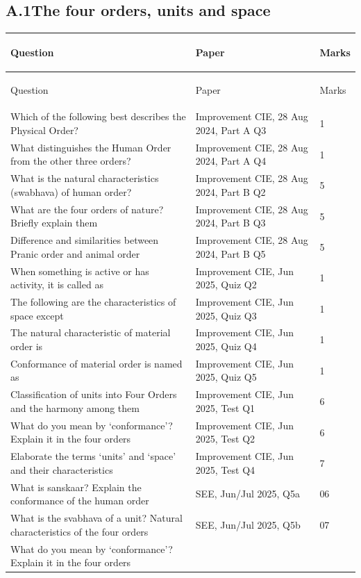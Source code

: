 \documentclass[11pt,a4paper,oneside]{book}
\newcommand{\blank}{\underline{\hspace{2.6em}}}
\newcommand{\hdr}[1]{{\sffamily\bfseries\color{white}\strut #1}}
\newenvironment{idxtable}
  {\renewcommand{\arraystretch}{1.3}%
   \arrayrulecolor{rulegrey}%
   \setlength{\LTpre}{6pt}\setlength{\LTpost}{4pt}%
   \begin{longtable}{P{104mm} P{40mm} C{13mm}}
   \rowcolor{slate}
   \hdr{Question} & \hdr{Paper} & \hdr{Marks} \\ \hline \endfirsthead
   \rowcolor{slate}
   \hdr{Question} & \hdr{Paper} & \hdr{Marks} \\ \hline \endhead}
  {\end{longtable}}
\begin{document}
\subsection*{A.1\enspace The four orders, units and space}

\begin{idxtable}
Which of the following best describes the Physical Order? &
  Improvement CIE, 28 Aug 2024, Part A Q3 & 1 \\ \hline
What distinguishes the Human Order from the other three orders? &
  Improvement CIE, 28 Aug 2024, Part A Q4 & 1 \\ \hline
What is the natural characteristics (swabhava) of human order? &
  Improvement CIE, 28 Aug 2024, Part B Q2 & 5 \\ \hline
What are the four orders of nature? Briefly explain them &
  Improvement CIE, 28 Aug 2024, Part B Q3 & 5 \\ \hline
Difference and similarities between Pranic order and animal order &
  Improvement CIE, 28 Aug 2024, Part B Q5 & 5 \\ \hline
When something is active or has activity, it is called as \blank &
  Improvement CIE, Jun 2025, Quiz Q2 & 1 \\ \hline
The following are the characteristics of space except \blank &
  Improvement CIE, Jun 2025, Quiz Q3 & 1 \\ \hline
The natural characteristic of material order is \blank &
  Improvement CIE, Jun 2025, Quiz Q4 & 1 \\ \hline
Conformance of material order is named as \blank &
  Improvement CIE, Jun 2025, Quiz Q5 & 1 \\ \hline
Classification of units into Four Orders and the harmony among them &
  Improvement CIE, Jun 2025, Test Q1 & 6 \\ \hline
What do you mean by `conformance'? Explain it in the four orders &
  Improvement CIE, Jun 2025, Test Q2 & 6 \\ \hline
Elaborate the terms `units' and `space' and their characteristics &
  Improvement CIE, Jun 2025, Test Q4 & 7 \\ \hline
What is sanskaar? Explain the conformance of the human order &
  SEE, Jun/Jul 2025, Q5a & 06 \\ \hline
What is the svabhava of a unit? Natural characteristics of the four orders &
  SEE, Jun/Jul 2025, Q5b & 07 \\ \hline
What do you mean by `conformance'? Explain it in the four orders &

\end{idxtable}
\end{document}
